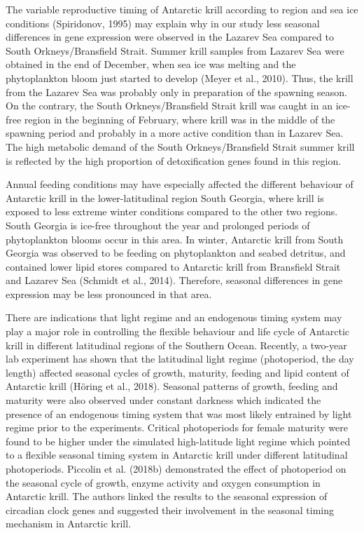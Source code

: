 The variable reproductive timing of Antarctic krill according to region and sea
ice conditions (Spiridonov, 1995) may explain why in our study less seasonal
differences in gene expression were observed in the Lazarev Sea compared to
South Orkneys/Bransfield Strait. Summer krill samples from Lazarev Sea were
obtained in the end of December, when sea ice was melting and the phytoplankton
bloom just started to develop (Meyer et al., 2010). Thus, the krill from the
Lazarev Sea was probably only in preparation of the spawning season. On the
contrary, the South Orkneys/Bransfield Strait krill was caught in an ice-free
region in the beginning of February, where krill was in the middle of the
spawning period and probably in a more active condition than in Lazarev Sea.
The high metabolic demand of the South Orkneys/Bransfield Strait summer krill
is reflected by the high proportion of detoxification genes found in this
region.

Annual feeding conditions may have especially affected the different behaviour
of Antarctic krill in the lower-latitudinal region South Georgia, where krill
is exposed to less extreme winter conditions compared to the other two regions.
South Georgia is ice-free throughout the year and prolonged periods of
phytoplankton blooms occur in this area. In winter, Antarctic krill from South
Georgia was observed to be feeding on phytoplankton and seabed detritus, and
contained lower lipid stores compared to Antarctic krill from Bransfield Strait
and Lazarev Sea (Schmidt et al., 2014). Therefore, seasonal differences in gene
expression may be less pronounced in that area.

There are indications that light regime and an endogenous timing system may
play a major role in controlling the flexible behaviour and life cycle of
Antarctic krill in different latitudinal regions of the Southern Ocean.
Recently, a two-year lab experiment has shown that the latitudinal light regime
(photoperiod, the day length) affected seasonal cycles of growth, maturity,
feeding and lipid content of Antarctic krill (Höring et al., 2018). Seasonal
patterns of growth, feeding and maturity were also observed under constant
darkness which indicated the presence of an endogenous timing system that was
most likely entrained by light regime prior to the experiments. Critical
photoperiods for female maturity were found to be higher under the simulated
high-latitude light regime which pointed to a flexible seasonal timing system
in Antarctic krill under different latitudinal photoperiods. Piccolin et al.
(2018b) demonstrated the effect of photoperiod on the seasonal cycle of growth,
enzyme activity and oxygen consumption in Antarctic krill. The authors linked
the results to the seasonal expression of circadian clock genes and suggested
their involvement in the seasonal timing mechanism in Antarctic krill.

